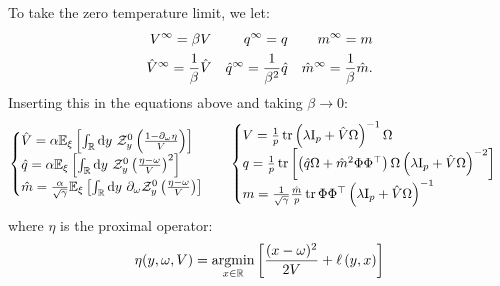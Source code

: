 \documentclass[11pt]{article}
\numberwithin{equation}{section}
\begin{document}
To take the zero temperature limit, we let:
\begin{align}
V^{\infty}=\beta V && q^{\infty}= q && m^{\infty}= m\notag\\
\hat{V}^{\infty}=\frac{1}{\beta} \hat{V} && \hat{q}^{\infty} = \frac{1}{\beta^2}\hat{q} && \hat{m}^{\infty} = \frac{1}{\beta}\hat{m}.
\end{align}
Inserting this in the equations above and taking $\beta\to 0$:
\begin{align}
	\begin{cases}
		\hat{V} = \alpha\mathbb{E}_{\xi}\left[\int_{\mathbb{R}}\text{d} y~\mathcal{Z}^{0}_{y} \left(\frac{1-\partial_{\omega}\eta}{V}\right)\right]\\
		\hat{q} = \alpha \mathbb{E}_{\xi}\left[\int_{\mathbb{R}}\text{d} y~\mathcal{Z}^{0}_{y} \left( \frac{\eta	-\omega}{V}\right)^2 \right]\\
		\hat{m} = \frac{\alpha}{\sqrt{\gamma}} \mathbb{E}_{\xi}\left[\int_{\mathbb{R}}\text{d} y~\partial_{\omega}\mathcal{Z}^{0}_{y}\left(\frac{\eta-\omega}{V}\right) \right]
	\end{cases} && 
	\begin{cases}
		V =  \frac{1}{p}\tr\left(\lambda\text{I}_{p}+\hat{V}\Omega\right)^{-1}\Omega\\
		q = \frac{1}{p}\tr\left[\left(\hat{q}\Omega+\hat{m}^{2}\Phi\Phi^{\top}\right)\Omega\left(\lambda\text{I}_{p}+\hat{V}\Omega\right)^{-2}\right]\\
		m= \frac{1}{\sqrt{\gamma}}\frac{\hat{m}}{p}\tr \Phi\Phi^{\top}\left(\lambda\text{I}_{p}+\hat{V}\Omega\right)^{-1}
	\end{cases}
\end{align}
\noindent where $\eta$ is the proximal operator:
\begin{align}
\eta(y,\omega,V) = \underset{x\in\mathbb{R}}{\textrm{argmin}}\left[\frac{(x-\omega)^2}{2V}+\ell\left(y, x\right)\right]
\end{align}
\end{document}
